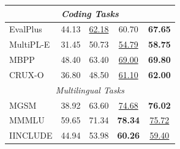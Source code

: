 \begin{table}[tbp]
\begin{tabular}{@{}lcccc@{}}
\midrule
\multicolumn{5}{c}{\textit{Coding Tasks}} \\
\midrule
EvalPlus & 44.13 & \underline{62.18} & 60.70 & \textbf{67.65} \\
MultiPL-E & 31.45 & 50.73 & \underline{54.79} & \textbf{58.75}  \\
MBPP & 48.40 & 63.40 & \underline{69.00} & \textbf{69.80} \\
CRUX-O & 36.80 & 48.50 & \underline{61.10} & \textbf{62.00}  \\
\midrule
\multicolumn{5}{c}{\textit{Multilingual Tasks}} \\
\midrule
MGSM & 38.92 & 63.60 & \underline{74.68} & \textbf{76.02}  \\
MMMLU & 59.65 & 71.34 & \textbf{78.34} & \underline{75.72} \\
IINCLUDE & 44.94 & 53.98 & \textbf{60.26} & \underline{59.40} \\
\bottomrule
\end{tabular}
\end{table}


